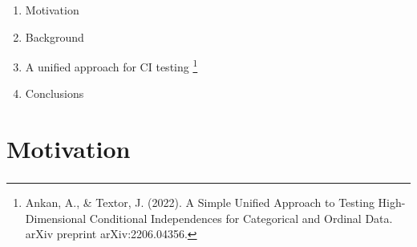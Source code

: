 \documentclass{beamer}
\begin{document}
\title{}
\author {Ankur Ankan}
\date{}
\maketitle

\begin{frame}
	\frametitle{}
	\begin{enumerate}
		\item Motivation
		\item Background
		\item A unified approach for CI testing \footnote{Ankan, A., \& Textor, J. (2022). A Simple Unified Approach to Testing High-Dimensional Conditional Independences for Categorical and Ordinal Data. arXiv preprint arXiv:2206.04356.}
		\item Conclusions
	\end{enumerate}
\end{frame}

\section{Motivation}
\begin{frame}
	\frametitle{}
\end{frame}

\begin{frame}
	\frametitle{}
\end{frame}

\begin{frame}
	\frametitle{}
\end{frame}

\begin{frame}
	\frametitle{}
\end{frame}

\begin{frame}
	\frametitle{}
\end{frame}

\begin{frame}
	\frametitle{}
\end{frame}
\end{document}
